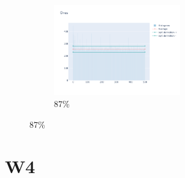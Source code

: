 \documentclass[12pt, fleqn]{report}                             %
\theoremstyle{break}                                            %
\begin{document}
\begin{figure}[ht!]
\begin{subfigure}[b]{0.4\linewidth}
          \includegraphics[width=0.6\textwidth]{Images/150/dia-d.png}
          \caption{87\%}
        \end{subfigure}
      \end{figure}



















      \clearpage
      \section{W4}

       



            
\end{document}
